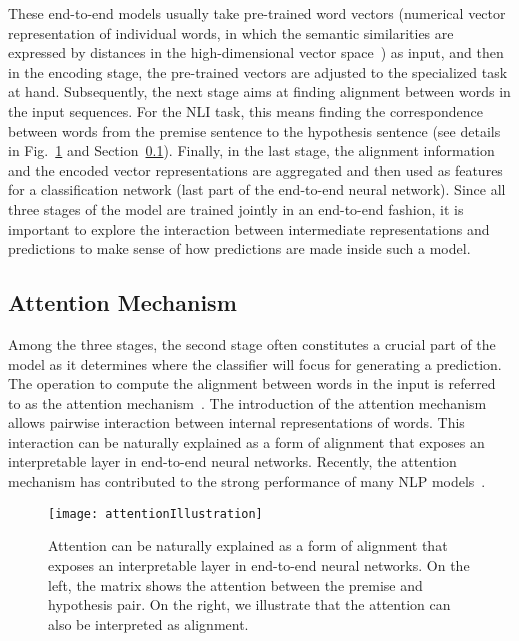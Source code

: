 These end-to-end models usually take pre-trained word vectors (numerical vector representation of individual words, in which the semantic similarities are expressed by distances in the high-dimensional vector space~\cite{MikolovSutskeverChen2013, PenningtonSocherManning2014}) as input, and then in the encoding stage, the pre-trained vectors are adjusted to the specialized task at hand. Subsequently, the next stage aims at finding alignment between words in the input sequences. For the NLI task, this means finding the correspondence between words from the premise sentence to the hypothesis sentence (see details in Fig.~\ref{fig:attention} and Section~\ref{sec:attention}). Finally, in the last stage, the alignment information and the encoded vector representations are aggregated and then used as features for a classification network (last part of the end-to-end neural network).
%
Since all three stages of the model are trained jointly in an end-to-end fashion, it is important to explore the interaction between intermediate representations and predictions to make sense of how predictions are made inside such a model.

\subsection{Attention Mechanism}
\label{sec:attention}
Among the three stages, the second stage often constitutes a crucial part of the model as it determines where the classifier will focus for generating a prediction. The operation to compute the alignment between words in the input is referred to as the attention mechanism~\cite{bahdanau2014neural}. 
The introduction of the attention mechanism allows
pairwise interaction between internal representations of words. 
This interaction can be naturally explained as a form of alignment that exposes an interpretable layer in end-to-end neural networks.
%
Recently, the attention mechanism has contributed to the strong performance of many NLP models~\cite{parikh2016emnlp,rush2015neural,yang2016hierarchical,seo2016bidirectional,schwartz2017high}.

\begin{figure}[htbp]
\centering
\vspace{-2mm}
 \texttt{[image: attentionIllustration]}
  \vspace{-2mm}
 \caption{Attention can be naturally explained as a form of alignment that exposes an interpretable layer in end-to-end neural networks. On the left, the matrix shows the attention between the premise and hypothesis pair. On the right, we illustrate that the attention can also be interpreted as alignment.}
\label{fig:attention}
\vspace{-2mm}
\end{figure}

